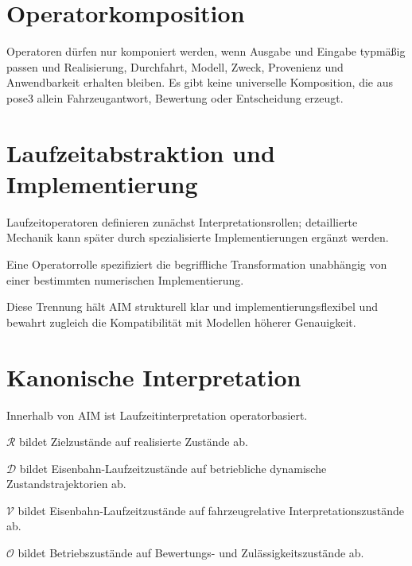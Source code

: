 \section{Operatorkomposition}

Operatoren dürfen nur komponiert werden, wenn Ausgabe und Eingabe typmäßig
passen und Realisierung, Durchfahrt, Modell, Zweck, Provenienz und
Anwendbarkeit erhalten bleiben. Es gibt keine universelle Komposition, die
aus pose3 allein Fahrzeugantwort, Bewertung oder Entscheidung erzeugt.

\section{Laufzeitabstraktion und Implementierung}

\begin{principle}[Laufzeitabstraktionsprinzip]
\label{princ:runtime-abstraction-principle}
Laufzeitoperatoren definieren zunächst Interpretationsrollen; detaillierte
Mechanik kann später durch spezialisierte Implementierungen ergänzt werden.
\end{principle}

\begin{definition}[Operatorrolle]
\label{def:runtime-operator-role}
Eine Operatorrolle spezifiziert die begriffliche Transformation unabhängig von
einer bestimmten numerischen Implementierung.
\end{definition}

Diese Trennung hält AIM strukturell klar und implementierungsflexibel und
bewahrt zugleich die Kompatibilität mit Modellen höherer Genauigkeit.

\section{Kanonische Interpretation}

\begin{proposition}
Innerhalb von AIM ist Laufzeitinterpretation operatorbasiert.
\end{proposition}
\begin{proposition}
\(\mathcal R\) bildet Zielzustände auf realisierte Zustände ab.
\end{proposition}
\begin{proposition}
\(\mathcal D\) bildet Eisenbahn-Laufzeitzustände auf betriebliche dynamische
Zustandstrajektorien ab.
\end{proposition}
\begin{proposition}
\(\mathcal V\) bildet Eisenbahn-Laufzeitzustände auf fahrzeugrelative
Interpretationszustände ab.
\end{proposition}
\begin{proposition}
\(\mathcal O\) bildet Betriebszustände auf Bewertungs- und
Zulässigkeitszustände ab.
\end{proposition}

